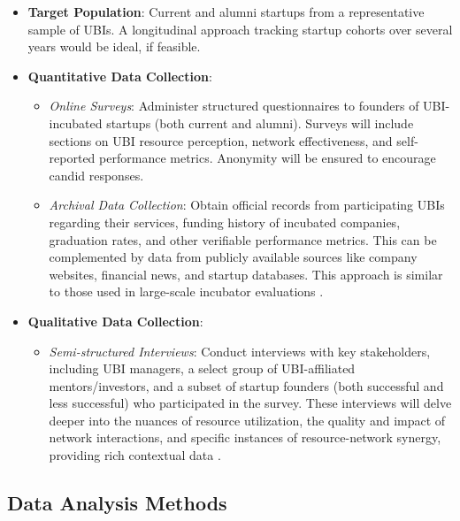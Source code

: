 \documentclass[../Main.tex]{subfiles}
\begin{document}
\begin{itemize}
    \item \textbf{Target Population}: Current and alumni startups from a representative sample of UBIs. A longitudinal approach tracking startup cohorts over several years would be ideal, if feasible.
    \item \textbf{Quantitative Data Collection}:
    \begin{itemize}
        \item \textit{Online Surveys}: Administer structured questionnaires to founders of UBI-incubated startups (both current and alumni). Surveys will include sections on UBI resource perception, network effectiveness, and self-reported performance metrics. Anonymity will be ensured to encourage candid responses.
        \item \textit{Archival Data Collection}: Obtain official records from participating UBIs regarding their services, funding history of incubated companies, graduation rates, and other verifiable performance metrics. This can be complemented by data from publicly available sources like company websites, financial news, and startup databases. This approach is similar to those used in large-scale incubator evaluations \cite{patton2014realising}.
    \end{itemize}
    \item \textbf{Qualitative Data Collection}:
    \begin{itemize}
        \item \textit{Semi-structured Interviews}: Conduct interviews with key stakeholders, including UBI managers, a select group of UBI-affiliated mentors/investors, and a subset of startup founders (both successful and less successful) who participated in the survey. These interviews will delve deeper into the nuances of resource utilization, the quality and impact of network interactions, and specific instances of resource-network synergy, providing rich contextual data \cite{barbero2012revisiting}.
    \end{itemize}
\end{itemize}

\subsection{Data Analysis Methods}
\end{document}
